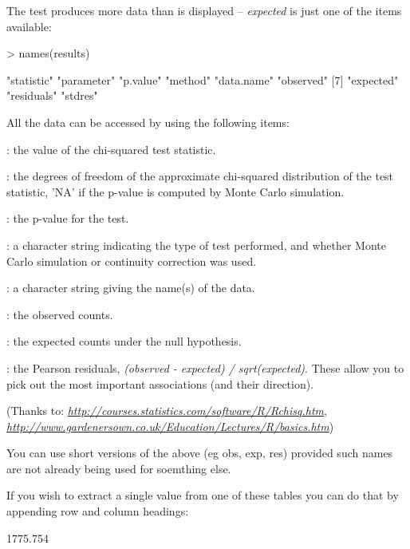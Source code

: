 \documentclass[a4paper,10pt]{article}
\begin{document}
The test produces more data than is displayed -- \textit{expected} is just one of the items available:
\begin{Schunk}
\begin{Sinput}
> names(results)
\end{Sinput}
\begin{Soutput}
[1] "statistic" "parameter" "p.value"   "method"    "data.name" "observed" 
[7] "expected"  "residuals" "stdres"   
\end{Soutput}
\end{Schunk}

All the data can be accessed by using the following items:
\begin{description}[itemsep=0.5ex,leftmargin=1cm]
\item[statistic]: the value of the chi-squared test statistic.
\item[parameter]: the degrees of freedom of the approximate chi-squared distribution of the test statistic, 'NA' if the p-value is computed by Monte Carlo simulation.
\item[p.value]: the p-value for the test.
\item[method]: a character string indicating the type of test performed, and whether Monte Carlo simulation or continuity correction was used.
\item[data.name]: a character string giving the name(s) of the data.
\item[observed]: the observed counts.
\item[expected]: the expected counts under the null hypothesis.
\item[residuals]: the Pearson residuals, \textit{(observed - expected) / sqrt(expected)}.  These allow you to pick out the most important associations (and their direction).
\end{description}
(Thanks to: \textit{\url{http://courses.statistics.com/software/R/Rchisq.htm}}, \textit{\url{http://www.gardenersown.co.uk/Education/Lectures/R/basics.htm}})

You can use short versions of the above (eg obs, exp, res) provided such names are not already being used for soemthing else.

If you wish to extract a single value from one of these tables you can do that by appending row and column headings:
\begin{Schunk}
\begin{Soutput}
[1] 1775.754
\end{Soutput}
\end{Schunk}
\end{document}
